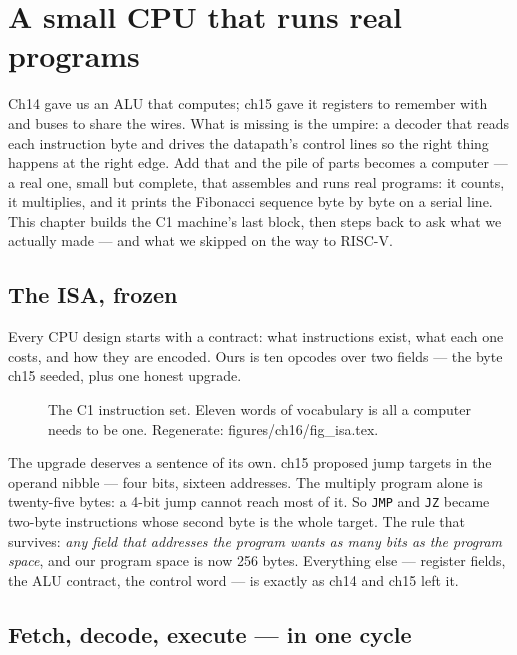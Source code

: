 \chapter{A small CPU that runs real programs}\label{ch:cpu8}

Ch14 gave us an ALU that computes; ch15 gave it registers to remember
with and buses to share the wires. What is missing is the umpire: a
decoder that reads each instruction byte and drives the datapath's
control lines so the right thing happens at the right edge. Add that
and the pile of parts becomes a computer --- a real one, small but
complete, that assembles and runs real programs: it counts, it
multiplies, and it prints the Fibonacci sequence byte by byte on a
serial line. This chapter builds the C1 machine's last block, then
steps back to ask what we actually made --- and what we skipped on
the way to RISC-V.

\section{The ISA, frozen}\label{sec:isa16}

Every CPU design starts with a contract: what instructions exist,
what each one costs, and how they are encoded. Ours is ten opcodes
over two fields --- the byte ch15 seeded, plus one honest upgrade.

\begin{figure}[htbp]
\centering

\caption{The C1 instruction set. Eleven words of vocabulary is all a
computer needs to be one. Regenerate: \ttfamily
figures/ch16/fig\_isa.tex.}
\label{fig:isa16}
\end{figure}

The upgrade deserves a sentence of its own. ch15 proposed jump
targets in the operand nibble --- four bits, sixteen addresses. The
multiply program alone is twenty-five bytes: a 4-bit jump cannot
reach most of it. So \texttt{JMP} and \texttt{JZ} became two-byte
instructions whose second byte is the whole target. The rule that
survives: \emph{any field that addresses the program wants as many
bits as the program space}, and our program space is now 256 bytes.
Everything else --- register fields, the ALU contract, the control
word --- is exactly as ch14 and ch15 left it.

\section{Fetch, decode, execute --- in one cycle}\label{sec:fde16}

